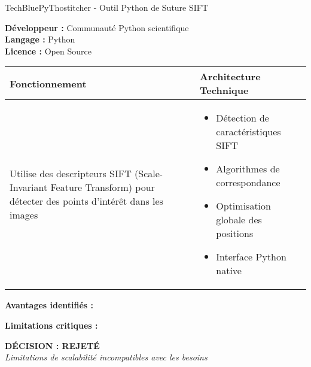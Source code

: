 \begin{techbox}{TechBlue}{PyThostitcher - Outil Python de Suture SIFT}

\textbf{Développeur :} Communauté Python scientifique \\
\textbf{Langage :} Python \\
\textbf{Licence :} Open Source

\vspace{0.5cm}

\begin{tabularx}{\textwidth}{|X|X|}
\hline
\rowcolor{LightGray}
\textbf{Fonctionnement} & \textbf{Architecture Technique} \\
\hline
Utilise des descripteurs SIFT (Scale-Invariant Feature Transform) pour détecter des points d'intérêt dans les images & 
\begin{itemize}[nosep]
\item Détection de caractéristiques SIFT
\item Algorithmes de correspondance
\item Optimisation globale des positions
\item Interface Python native
\end{itemize} \\
\hline
\end{tabularx}

\vspace{0.5cm}

\textbf{Avantages identifiés :}
\begin{itemize}[leftmargin=*]
\end{itemize}

\textbf{Limitations critiques :}
\begin{itemize}[leftmargin=*]
\end{itemize}

\begin{center}
\textbf{\textcolor{DangerRed}{DÉCISION : REJETÉ}}\\
\textit{Limitations de scalabilité incompatibles avec les besoins}
\end{center}

\end{techbox}

